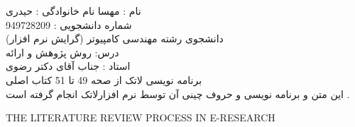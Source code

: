 \documentclass[a4paper,12pt]{article}
\begin{document}
\noindent
   نام : مهسا 
 نام خانوادگی : حیدری  \\
 شماره دانشجویی : 949728209 \\
 دانشجوی رشته مهندسی کامپیوتر (گرایش نرم افزار)\\
 درس:  روش پژوهش و ارائه \\
 استاد  : جناب  آقای دکتر رضوی  \\                                                                                                                                                                                                                                                                                                                                                                                
برنامه نویسی لاتک از صحه 49 تا 51 کتاب اصلی   \\  

   \noindent
این متن و برنامه نویسی  و حروف چینی آن   توسط نرم افزارلاتک  انجام گرفته است .                                     
\vspace{0.1cm}
\vspace{0.1cm}
\vspace{0.1cm}
\begin{center}

THE LITERATURE REVIEW PROCESS IN E-RESEARCH

\end{center}
      
\end{document}
